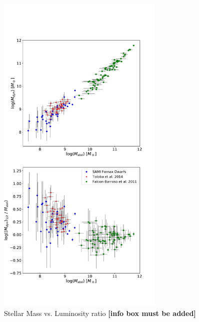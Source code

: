 \documentclass{aa}
\begin{document}
\begin{figure}[!htb]
   \centering
   \includegraphics[width=8cm]{../2_pipeline/2_MassDyn_Luminosity+Liter/DyM_StM+Liter_DWARF.pdf}   		
  	 \caption{Stellar Mass vs. Luminosity ratio \textbf{[info box must be added]}}
         \label{fig:ML}
\end{figure}
\end{document}
